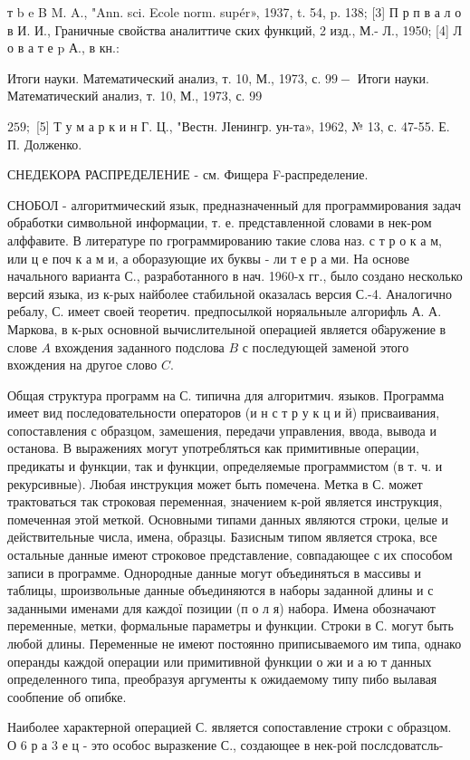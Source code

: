 \documentclass[10pt]{article}
\begin{document}
т b e B M. A., "Ann. sci. Ecole norm. supér», 1937, t. 54, p. 138; [3] П р п в а л о в И. И., Граничные свойства аналиттиче ских функций, 2 изд., М.- Л., 1950; [4] Л о в а т е p А., в кн.:

Итоги науки. Математический анализ, т. 10, М., 1973, с. $99-$ Итоги науки. Математический анализ, т. 10, М., 1973, с. 99

$259 ;$ [5] Т у м а р к и н Г. Ц., "Вестн. ЈІенингр. ун-та», 1962, № 13, с. 47-55. Е. П. Долженко.



СНЕДЕКОРА РАСПРЕДЕЛЕНИЕ - см. Фищера F-распределение.



СНОБОЛ - алгоритмический язык, предназначенный для программирования задач обработки символьной информации, т. е. представленной словами в нек-ром алффавите. В литературе по грограммированию такие слова наз. с т р о к а м, или ц е поч к а м и, а оборазующие их буквы - ли т е р а ми. На основе начального варианта С., разработанного в нач. 1960-х гг., было создано несколько версий языка, из к-рых найболее стабильной оказалась версия С.-4. Аналогично ребалу, С. имеет своей теоретич. предпосылкой норяальныле алгорифль А. А. Маркова, в к-рых основной вычислителыной операцией является об̈аружение в слове $A$ вхождения заданного подслова $B$ с последующей заменой этого вхождения на другое слово $C$.



Общая структура программ на С. типична для алгоритмич. языков. Программа имеет вид последовательности операторов (и н с т р у к ц и й) присваивания, сопоставления с образцом, замешения, передачи управления, ввода, вывода и останова. В выражениях могут употребляться как примитивные операции, предикаты и функции, так и функции, определяемые программистом (в т. ч. и рекурсивные). Любая инструкция может быть помечена. Метка в С. может трактоваться так строковая переменная, значением к-рой является инструкция, помеченная этой меткой. Основными типами данных являются строки, целые и действительные числа, имена, образцы. Базисным типом является строка, все остальные данные имеют строковое представление, совпадающее с их способом записи в программе. Однородные данные могут объединяться в массивы и таблицы, шроизвольные данные объединяются в наборы заданной длины и с заданными именами для каждої позиции (п о л я) набора. Имена обозначают переменные, метки, формальные параметры и функции. Строки в С. могут быть любой длины. Переменные не имеют постоянно приписываемого им типа, однако операнды каждой операции или примитивной функции о жи и а ю т данных определенного типа, преобразуя аргументы к ожидаемому типу пибо вылавая сообпение об опибке.



Наиболее характерной операцией С. является сопоставление строки с образцом. О 6 р а 3 е ц - это особос выразкение С., создающее в нек-рой послсдоватсль-
\end{document}
